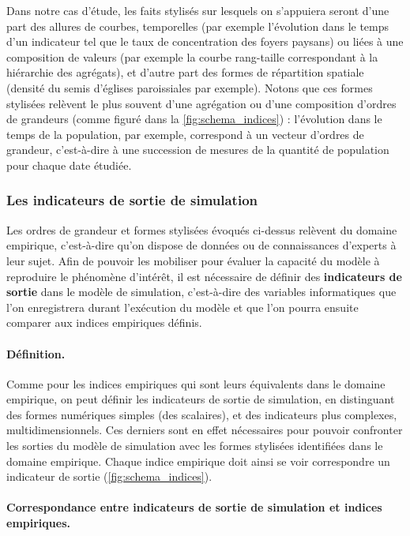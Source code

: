 Dans notre cas d'étude, les faits stylisés sur lesquels on s'appuiera seront d'une part des \og allures\fg{} de courbes, temporelles (par exemple l'évolution dans le temps d'un indicateur tel que le taux de concentration des foyers paysans) ou liées à une composition de valeurs (par exemple la courbe rang-taille correspondant à la hiérarchie des agrégats), et d'autre part des formes de répartition spatiale (densité du semis d'églises paroissiales par exemple).
Notons que ces formes stylisées relèvent le plus souvent d'une agrégation ou d'une composition d'ordres de grandeurs (comme figuré dans la \cref{fig:schema_indices}) :
l'évolution dans le temps de la population, par exemple, correspond à un vecteur d'ordres de grandeur, c'est-à-dire à une succession de mesures de la quantité de population pour chaque date étudiée.

\subsubsection{Les indicateurs de sortie de simulation \label{subsubsec:indicateurs-sortie}}

Les ordres de grandeur et formes stylisées évoqués ci-dessus relèvent du domaine empirique, c'est-à-dire qu'on dispose de données ou de connaissances d'experts à leur sujet.
Afin de pouvoir les mobiliser pour évaluer la capacité du modèle à reproduire le phénomène d'intérêt, il est nécessaire de définir des \textbf{indicateurs de sortie} dans le modèle de simulation, c'est-à-dire des variables informatiques que l'on enregistrera durant l'exécution du modèle et que l'on pourra ensuite comparer aux indices empiriques définis.

\paragraph{Définition.}
Comme pour les indices empiriques qui sont leurs équivalents dans le domaine empirique, on peut définir les indicateurs de sortie de simulation, en distinguant des formes numériques simples (des scalaires), et des indicateurs plus complexes, multidimensionnels.
Ces derniers sont en effet nécessaires pour pouvoir confronter les sorties du modèle de simulation avec les formes stylisées identifiées dans le domaine empirique.
Chaque indice empirique doit ainsi se voir correspondre un indicateur de sortie (\cref{fig:schema_indices}).

\paragraph{Correspondance entre indicateurs de sortie de simulation et indices empiriques.}\label{par:correspondance}

